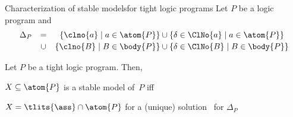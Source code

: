 \begin{frame}{Characterization of stable models}{for \alert<3>{tight} logic programs}
\bigskip
Let $P$ be a logic program and
\[
\begin{array}{lcr@{}c@{}l}
\Delta_P
& = &
\{\clno{a} \mid a\in\atom{P}\}
& {} \cup {} &
\{\delta\in\ClNo{a} \mid a\in\atom{P}\}
\\[2pt]
& \cup &
\{\clno{B} \mid B\in\body{P}\}
& {} \cup {} &
\{\delta\in\ClNo{B}\mid B\in\body{P}\}
\end{array}
\]
\bigskip
\pause
\begin{theorem}
Let $P$ be a \alert{tight} logic program. Then,

\qquad $X\subseteq\atom{P}$ is a stable model of~$P$ \alert{iff}

\qquad $X=\tlits{\ass}\cap\atom{P}$ for a (unique) solution \ass\ for $\Delta_P$
\end{theorem}
\end{frame}
%
